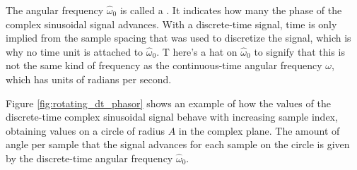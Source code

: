 The angular frequency $\hat{\omega}_0$ is called a \emph{}. 
It indicates how many \emph{} the phase of the complex sinusoidal signal advances. 
With a discrete-time signal, time is only implied from the sample spacing that was used to discretize the signal, which is why no time unit is attached to $\hat{\omega}_0$. T
here's a hat on $\hat{\omega}_0$ to signify that this is not the same kind of frequency as the continuous-time angular frequency $\omega$, which has units of radians per second.

Figure \ref{fig:rotating_dt_phasor} shows an example of how the values of the discrete-time complex sinusoidal signal behave with increasing sample index, 
obtaining values on a circle of radius $A$ in the complex plane. The amount of angle per sample that the signal advances for 
each sample on the circle is given by the discrete-time angular frequency $\hat{\omega}_0$. 

